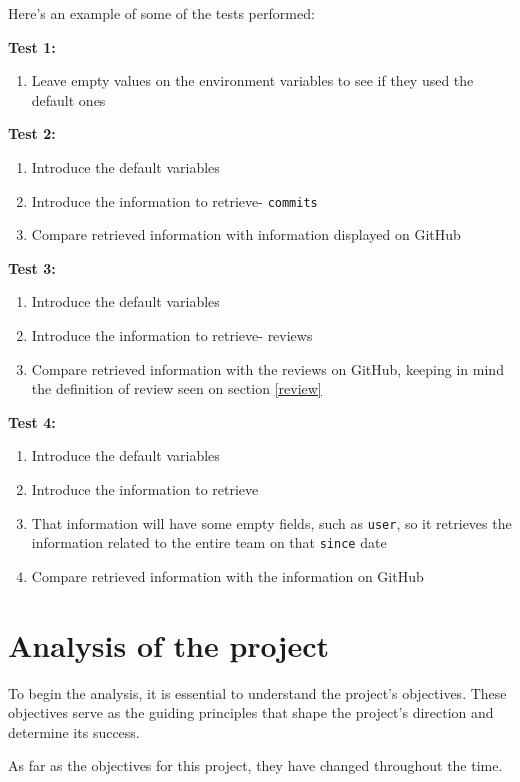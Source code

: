 Here's an example of some of the tests performed:

\textbf{Test 1:}
\begin{enumerate}
    \item Leave empty values on the environment variables to see if they used the default ones
\end{enumerate}

\textbf{Test 2:}
\begin{enumerate}
    \item Introduce the default variables
    \item Introduce the information to retrieve- \texttt{commits}
    \item Compare retrieved information with information displayed on GitHub
\end{enumerate}

\textbf{Test 3:}
\begin{enumerate}
    \item Introduce the default variables
    \item Introduce the information to retrieve- reviews
    \item Compare retrieved information with the reviews on GitHub, keeping in mind the definition of review seen on section \ref{review}
\end{enumerate}

\textbf{Test 4:}
\begin{enumerate}
    \item Introduce the default variables
    \item Introduce the information to retrieve
    \item That information will have some empty fields, such as \texttt{user}, so it retrieves the information related to the entire team on that \texttt{since} date
    \item Compare retrieved information with the information on GitHub
\end{enumerate}

\section{Analysis of the project}

To begin the analysis, it is essential to understand the project's objectives. These objectives serve as the guiding principles that shape the project's direction and determine its success.\newline

As far as the objectives for this project, they have changed throughout the time.


